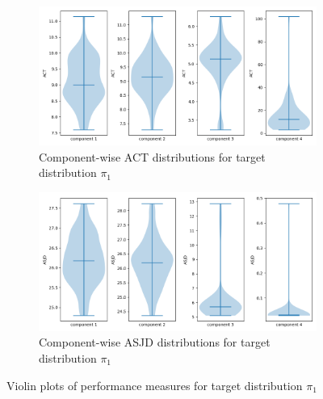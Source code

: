 \documentclass{scrartcl}
\begin{document}
    \begin{figure}
        \centering
        \begin{subfigure}{0.42\textheight}
              \centering
              \includegraphics[width=.8\linewidth]{../figs/ACT_pi_1.png}
              \caption{Component-wise ACT distributions for target distribution $\pi_1$}
              \label{violin_plots_pi_1_act}
        \end{subfigure}
        \begin{subfigure}{0.42\textheight}
              \centering
              \includegraphics[width=.8\linewidth]{../figs/ASJD_pi_1.png}
              \caption{Component-wise ASJD distributions for target distribution $\pi_1$}
              \label{violin_plots_pi_1_asjd}
        \end{subfigure}
        \caption{Violin plots of performance measures for target distribution $\pi_1$}
        \label{violin_plots_pi_1}
    \end{figure}
\end{document}
